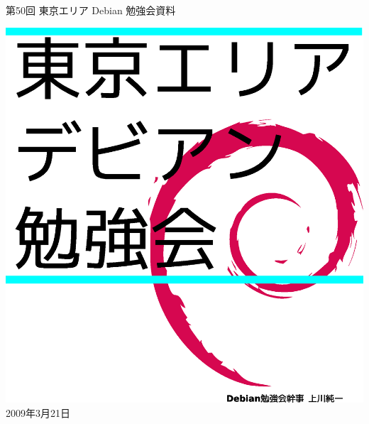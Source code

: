 \documentclass[mingoth,a4paper]{jsarticle}
\newcommand{\debmtgyear}{2009}
\newcommand{\debmtgmonth}{3}
\newcommand{\debmtgdate}{21}
\newcommand{\debmtgnumber}{50}
\begin{document}
\begin{titlepage}
\thispagestyle{empty}


\vspace*{-2cm}
第\debmtgnumber{}回 東京エリア Debian 勉強会資料

\hspace*{-2.4cm}
\includegraphics[width=210mm]{image200801/2008title.eps}\\
\hfill{}\debmtgyear{}年\debmtgmonth{}月\debmtgdate{}日

\end{titlepage}

\end{document}

